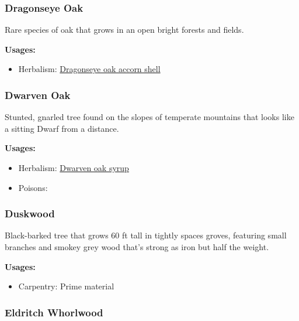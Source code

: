 \subsubsection{Dragonseye Oak}
\label{Dragonseye Oak}

Rare species of oak that grows in an open bright forests and fields.

\vspace{5mm}

\textbf{Usages:}

\begin{itemize}[noitemsep]
\item[] Herbalism: \hyperref[Dragonseye oak accorn shell]{Dragonseye oak accorn shell}
\end{itemize}

\subsubsection{Dwarven Oak}
\label{Dwarven Oak}

Stunted, gnarled tree found on the slopes of temperate mountains that looks like a sitting Dwarf from a distance.

\vspace{5mm}

\textbf{Usages:}

\begin{itemize}[noitemsep]
\item[] Herbalism: \hyperref[Dwarven oak syrup]{Dwarven oak syrup}
\item[] Poisons: \poison
\end{itemize}

\subsubsection{Duskwood}

Black-barked tree that grows 60 ft tall in tightly spaces groves, featuring small branches and smokey grey wood that's strong as iron  but half the weight.

\vspace{5mm}

\textbf{Usages:}

\begin{itemize}[noitemsep]
\item[] Carpentry: Prime material
\end{itemize}


\subsubsection{Eldritch Whorlwood}

